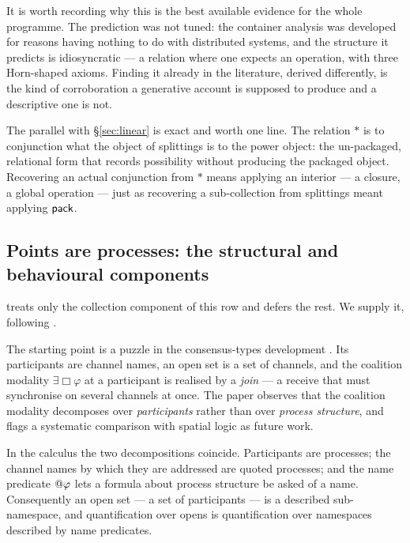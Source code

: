 It is worth recording why this is the best available evidence for the whole
programme. The prediction was not tuned: the container analysis was developed for
reasons having nothing to do with distributed systems, and the structure it
predicts is idiosyncratic --- a relation where one expects an operation, with
three Horn-shaped axioms. Finding it already in the literature, derived
differently, is the kind of corroboration a generative account is supposed to
produce and a descriptive one is not.

\begin{remark}
The parallel with \S\ref{sec:linear} is exact and worth one line. The relation
$\ast$ is to conjunction what the object of splittings is to the power object: the
un-packaged, relational form that records possibility without producing the
packaged object. Recovering an actual conjunction from $\ast$ means applying an
interior --- a closure, a global operation --- just as recovering a sub-collection
from splittings meant applying $\mathsf{pack}$.
\end{remark}

\subsection{Points are processes: the structural and behavioural components}

\cite{Zeus} treats only the collection component of this row and defers the rest.
We supply it, following \cite{QuorumNote}.

The starting point is a puzzle in the consensus-types development
\cite{ConsensusTypes}. Its participants are channel names, an open set is a set of
channels, and the coalition modality $\exists\Box\varphi$ at a participant is
realised by a \emph{join} --- a receive that must synchronise on several channels
at once. The paper observes that the coalition modality decomposes over
\emph{participants} rather than over \emph{process structure}, and flags a
systematic comparison with spatial logic as future work.

\begin{proposition}
\label{prop:collapse}
In the \rhoc{} calculus the two decompositions coincide. Participants are
processes; the channel names by which they are addressed are quoted processes; and
the name predicate $@\varphi$ lets a formula about process structure be
asked of a name. Consequently an open set --- a set of participants --- is a
described sub-namespace, and quantification over opens is quantification over
namespaces described by name predicates.
\end{proposition}

